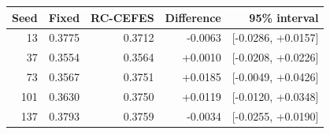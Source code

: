 \begin{tabular}{rrrrr}
\toprule
Seed & Fixed & RC-CEFES & Difference & 95\% interval \\
\midrule
13 & 0.3775 & 0.3712 & -0.0063 & [-0.0286, +0.0157] \\
37 & 0.3554 & 0.3564 & +0.0010 & [-0.0208, +0.0226] \\
73 & 0.3567 & 0.3751 & +0.0185 & [-0.0049, +0.0426] \\
101 & 0.3630 & 0.3750 & +0.0119 & [-0.0120, +0.0348] \\
137 & 0.3793 & 0.3759 & -0.0034 & [-0.0255, +0.0190] \\
\bottomrule
\end{tabular}
